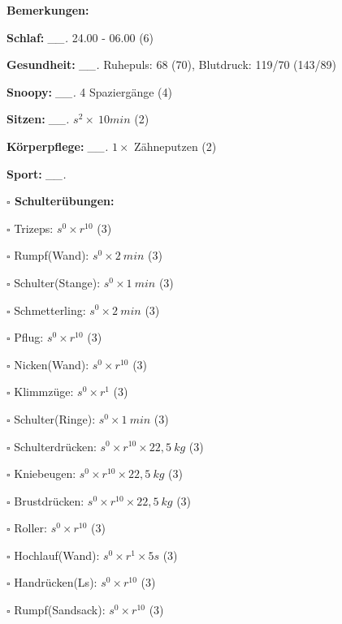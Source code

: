 \documentclass[10pt,a4paper]{article}
\newcommand\prop[1] {{\color {alizarin} {\bf #1}}}             %
\newcommand\mand[1] {{\color {burntorange} {\bf #1}}}          %
\newcommand\topspace{\vskip -15pt \hskip 20pt}
\newcommand\n[1] { {\sl #1.} \hskip 5pt }
\begin{document}
\begin{mdframed}[style=daystyle]
  \begin{labeling}{{\mand {Bemerkungen:}}}
    \setlength\itemsep{-3pt}
  \item[{\mand {Schlaf:}}]        \n{\_\_} 24.00 - 06.00 (6)
  \item[{\mand {Gesundheit:}}]    \n{\_\_} Ruhepuls: 68 (70), Blutdruck: 119/70 (143/89)
  \item[{\mand {Snoopy:}}]        \n{\_\_} 4 Spaziergänge (4)  
  \item[{\mand {Sitzen:}}]        \n{\_\_} $s^2 \times\ 10 min$ (2)
  \item[{\mand {Körperpflege:}}]  \n{\_\_} $1 \times$ Zähneputzen (2)
  \item[{\mand {Sport:}}]         \n{\_\_}
    \topspace
    \begin{minipage}{0.75\textwidth}  
      \begin{labeling}{\prop {$\square$ {Schulterübungen:}}} 
        \setlength\itemsep{-3pt}
      \item[$\square$ Trizeps:]          $s^0 \times r^{10}$ (3)
      \item[$\square$ Rumpf(Wand):]      $s^0 \times 2\ min$ (3)
      \item[$\square$ Schulter(Stange):] $s^0 \times 1\ min$ (3)
      \item[$\square$ Schmetterling:]    $s^0 \times 2\ min$ (3)
      \item[$\square$ Pflug:]            $s^0 \times r^{10}$ (3)
      \item[$\square$ Nicken(Wand):]     $s^0 \times r^{10}$ (3)
      \item[$\square$ Klimmzüge:]        $s^0 \times r^1$ (3)
      \item[$\square$ Schulter(Ringe):]  $s^0 \times 1\ min$ (3)
      \item[$\square$ Schulterdrücken:]  $s^0 \times r^{10} \times 22,5\ kg$ (3)
      \item[$\square$ Kniebeugen:]       $s^0 \times r^{10} \times 22,5\ kg$ (3)
      \item[$\square$ Brustdrücken:]     $s^0 \times r^{10} \times 22,5\ kg$ (3)
      \item[$\square$ Roller:]           $s^0 \times r^{10}$ (3)
      \item[$\square$ Hochlauf(Wand):]   $s^0 \times r^{1} \times 5s$ (3)
      \item[$\square$ Handrücken(Ls):]   $s^0 \times r^{10}$ (3)
      \item[$\square$ Rumpf(Sandsack):]  $s^0 \times r^{10}$ (3)

\end{labeling}
\end{minipage}
\end{labeling}
\end{mdframed}
\end{document}
